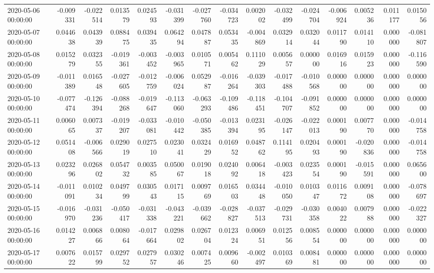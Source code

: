\begin{tabular}{lrrrrrrrrrrrrrr}
2020-05-06 00:00:00 & -0.009331 & -0.022514 & 0.013579 & 0.024593 & -0.031399 & -0.027760 & -0.034723 & 0.002002 & -0.032499 & -0.024704 & -0.006924 & 0.005236 & 0.011177 & 0.015056 \\
2020-05-07 00:00:00 & 0.044638 & 0.043939 & 0.088475 & 0.039435 & 0.064294 & 0.047887 & 0.053435 & -0.004869 & 0.032914 & 0.032044 & 0.011790 & 0.014110 & 0.000000 & -0.081807 \\
2020-05-08 00:00:00 & 0.015279 & 0.032355 & -0.019361 & -0.003452 & -0.003965 & 0.010571 & 0.005462 & 0.111029 & 0.005657 & 0.000000 & 0.016916 & 0.015923 & 0.000000 & -0.116590 \\
2020-05-09 00:00:00 & -0.011389 & 0.016548 & -0.027605 & -0.012759 & -0.006024 & 0.052987 & -0.016264 & -0.039303 & -0.017488 & -0.010568 & 0.000000 & 0.000000 & 0.000000 & 0.000000 \\
2020-05-10 00:00:00 & -0.077474 & -0.126394 & -0.088268 & -0.019647 & -0.113060 & -0.063293 & -0.109486 & -0.118451 & -0.104707 & -0.091852 & 0.000000 & 0.000000 & 0.000000 & 0.000000 \\
2020-05-11 00:00:00 & 0.006065 & 0.007337 & -0.019207 & -0.033081 & -0.010442 & -0.050385 & -0.013394 & 0.023195 & -0.026147 & -0.022013 & 0.000190 & 0.007770 & 0.000000 & -0.014758 \\
2020-05-12 00:00:00 & 0.051408 & -0.006566 & 0.029019 & 0.027510 & 0.023041 & 0.032429 & 0.016952 & 0.048762 & 0.114195 & 0.020493 & 0.000190 & -0.020836 & 0.000000 & -0.014758 \\
2020-05-13 00:00:00 & 0.023296 & 0.026802 & 0.054732 & 0.003585 & 0.050067 & 0.019018 & 0.024092 & 0.006418 & -0.003423 & 0.023554 & 0.000190 & -0.015591 & 0.000000 & 0.065600 \\
2020-05-14 00:00:00 & -0.011091 & 0.010234 & 0.049799 & 0.030543 & 0.017115 & 0.009769 & 0.016503 & 0.034448 & -0.010050 & 0.010347 & 0.011672 & 0.009108 & 0.000000 & -0.078697 \\
2020-05-15 00:00:00 & -0.016970 & -0.031236 & -0.050417 & -0.031338 & -0.043221 & -0.039662 & -0.028827 & -0.037513 & -0.029731 & -0.030358 & 0.004022 & 0.007988 & 0.000000 & -0.022327 \\
2020-05-16 00:00:00 & 0.014227 & 0.006866 & 0.008064 & -0.017664 & 0.029802 & 0.026704 & 0.012324 & 0.006951 & 0.012556 & 0.008554 & 0.000000 & 0.000000 & 0.000000 & 0.000000 \\
2020-05-17 00:00:00 & 0.007622 & 0.015799 & 0.029752 & 0.027957 & 0.030246 & 0.007425 & 0.009660 & -0.002497 & 0.010369 & 0.008481 & 0.000000 & 0.000000 & 0.000000 & 0.000000 \\

\end{tabular}
